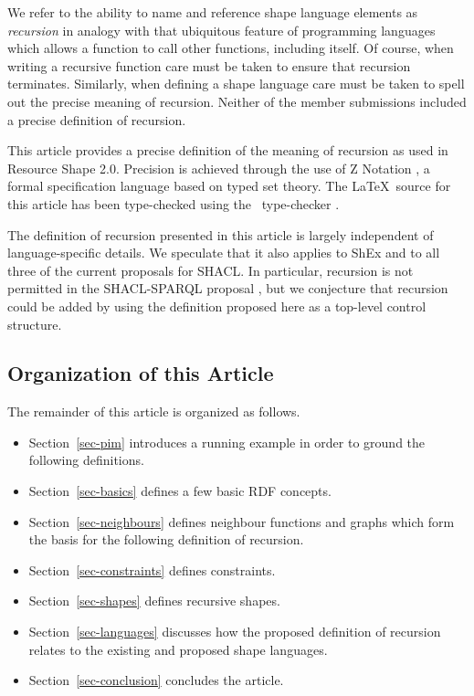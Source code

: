 \documentclass{article}
\begin{document}
We refer to the ability to name and reference shape language elements as {\em recursion} in analogy with that ubiquitous feature of programming languages which allows a function to call other functions, including itself.
Of course, when writing a recursive function care must be taken to ensure that recursion terminates.
Similarly, when defining a shape language care must be taken to spell out the precise meaning of recursion.
Neither of the member submissions included a precise definition of recursion.

This article provides a precise definition of the meaning of recursion as used in Resource Shape 2.0.
Precision is achieved through the use of Z Notation \cite{spivey:zrm}, a formal specification language based on
typed set theory.
The \LaTeX\ source for this article has been type-checked using the \fuzz\ type-checker \cite{spivey:fuzz}.

The definition of recursion presented in this article is largely independent of language-specific details.
We speculate that it also applies to ShEx and to all three of the current proposals for SHACL.
In particular, recursion is not permitted in the SHACL-SPARQL proposal \cite{peter:shacl}, but we conjecture
that recursion could be added by using the definition proposed here as a top-level control structure.

\subsection{Organization of this Article}
The remainder of this article is organized as follows.
\begin{itemize}
\item Section~\ref{sec-pim} introduces a running example in order to ground the following definitions.
\item Section~\ref{sec-basics} defines a few basic RDF concepts.
\item Section~\ref{sec-neighbours} defines neighbour functions and graphs which form the basis for the following definition of recursion.
\item Section~\ref{sec-constraints} defines constraints.
\item Section~\ref{sec-shapes} defines recursive shapes.
\item Section~\ref{sec-languages} discusses how the proposed definition of recursion relates to the existing and proposed shape languages.
\item Section~\ref{sec-conclusion} concludes the article.
\end{itemize}
\end{document}
